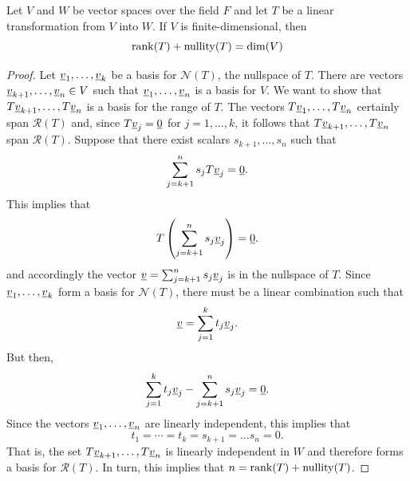 \begin{theorem}
Let $V$ and $W$ be vector spaces over the field $F$ and let $T$ be a linear transformation from $V$ into $W$.
If $V$ is finite-dimensional, then
\begin{equation*}
\mathrm{rank} (T) + \mathrm{nullity} (T) = \dim (V)
\end{equation*}
\end{theorem}
\begin{proof}
Let $\underline{v}_1, \ldots, \underline{v}_k$ be a basis for $\mathcal{N}(T)$, the nullspace of $T$.
There are vectors $\underline{v}_{k+1}, \ldots, \underline{v}_n \in V$ such that $\underline{v}_1, \ldots, \underline{v}_n$ is a basis for $V$.
We want to show that $T \underline{v}_{k+1}, \ldots, T \underline{v}_n$ is a basis for the range of $T$.
The vectors $T \underline{v}_1, \ldots, T \underline{v}_n$ certainly span $\mathcal{R}(T)$ and, since $T \underline{v}_j = \underline{0}$ for $j = 1, \ldots, k$, it follows that $T \underline{v}_{k+1}, \ldots, T\underline{v}_n$ span $\mathcal{R}(T)$.
Suppose that there exist scalars $s_{k+1}, \ldots, s_n$ such that
\begin{equation*}
\sum_{j=k+1}^n s_j T \underline{v}_j = \underline{0}.
\end{equation*}
This implies that
\begin{equation*}
T \left( \sum_{j=k+1}^n s_j \underline{v}_j \right) = \underline{0}.
\end{equation*}
and accordingly the vector $\underline{v} = \sum_{j=k+1}^n s_j \underline{v}_j$ is in the nullspace of $T$.
Since $\underline{v}_1, \ldots, \underline{v}_k$ form a basis for $\mathcal{N}(T)$, there must be a linear combination such that
\begin{equation*}
\underline{v} = \sum_{j=1}^k t_j \underline{v}_j .
\end{equation*}
But then,
\begin{equation*}
\sum_{j=1}^k t_j \underline{v}_j - \sum_{j=k+1}^n s_j \underline{v}_j = \underline{0}.
\end{equation*}
Since the vectors $\underline{v}_1, \ldots, \underline{v}_n$ are linearly independent, this implies that
\begin{equation*}
t_1 = \cdots = t_k = s_{k+1} = \hdots s_n = 0.
\end{equation*}
That is, the set $T \underline{v}_{k+1}, \ldots, T \underline{v}_n$ is linearly independent in $W$ and therefore forms a basis for $\mathcal{R}(T)$.
In turn, this implies that $n = \mathrm{rank}(T) + \mathrm{nullity}(T)$.
\end{proof}

